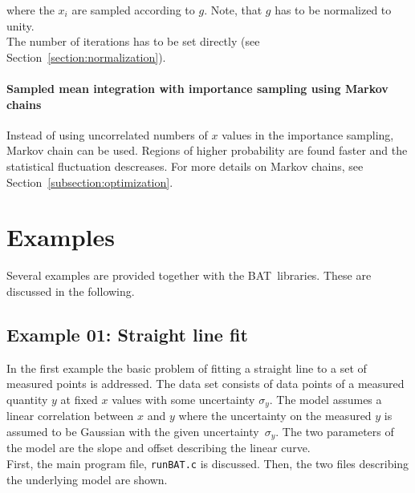 \documentclass[11pt, a4paper]{article}
\newcommand{\BAT}{{\sc BAT}}
\begin{document}
\noindent 
where the $x_{i}$ are sampled according to $g$. Note, that $g$ has to
be normalized to unity. \\ 

\noindent 
The number of iterations has to be set directly (see Section~\ref{section:normalization}). 

\paragraph{Sampled mean integration with importance sampling using Markov chains} 

Instead of using uncorrelated numbers of $x$ values in the importance
sampling, Markov chain can be used. Regions of higher probability are
found faster and the statistical fluctuation descreases. For more
details on Markov chains, see Section~\ref{subsection:optimization}.


\section{Examples}
\label{section:examples} 

Several examples are provided together with the \BAT\ libraries. These
are discussed in the following. 


\subsection{Example 01: Straight line fit} 

In the first example the basic problem of fitting a straight line to a
set of measured points is addressed. The data set consists of data
points of a measured quantity $y$ at fixed $x$ values with some
uncertainty $\sigma_{y}$. The model assumes a linear correlation
between $x$ and $y$ where the uncertainty on the measured $y$ is
assumed to be Gaussian with the given uncertainty~$\sigma_{y}$. The
two parameters of the model are the slope and offset describing the
linear curve. \\

\noindent 
First, the main program file, \verb|runBAT.c| is discussed. Then, the
two files describing the underlying model are shown. \\ 
\end{document}

